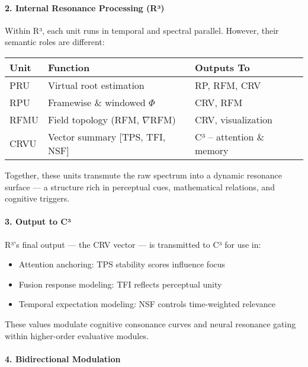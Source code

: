 \documentclass{article}
\begin{document}
\paragraph{2. Internal Resonance Processing (R³)}

Within R³, each unit runs in temporal and spectral parallel. However, their semantic roles are different:

\begin{center}
\begin{tabular}{|l|l|l|}
\hline
\textbf{Unit} & \textbf{Function} & \textbf{Outputs To} \\
\hline
PRU & Virtual root estimation & RP, RFM, CRV \\
RPU & Framewise \& windowed $\Phi$ & CRV, RFM \\
RFMU & Field topology (RFM, $\nabla$RFM) & CRV, visualization \\
CRVU & Vector summary [TPS, TFI, NSF] & C³ – attention \& memory \\
\hline
\end{tabular}
\end{center}

Together, these units transmute the raw spectrum into a dynamic resonance surface — a structure rich in perceptual cues, mathematical relations, and cognitive triggers.

\paragraph{3. Output to C³}

R³’s final output — the CRV vector — is transmitted to C³ for use in:

\begin{itemize}
    \item Attention anchoring: TPS stability scores influence focus
    \item Fusion response modeling: TFI reflects perceptual unity
    \item Temporal expectation modeling: NSF controls time-weighted relevance
\end{itemize}

These values modulate cognitive consonance curves and neural resonance gating within higher-order evaluative modules.

\paragraph{4. Bidirectional Modulation}
\end{document}
